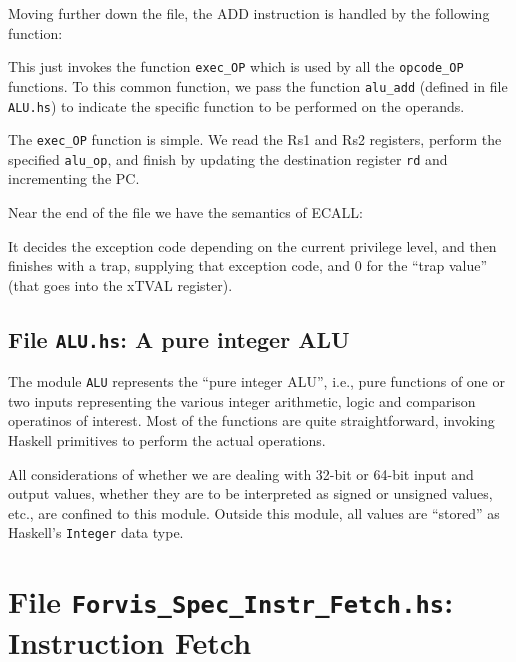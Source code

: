 \documentclass[11pt]{article}
\begin{document}
Moving further down the file, the ADD instruction is handled by the
following function:



This just invokes the function \verb|exec_OP| which is used by all the
\verb|opcode_OP| functions.  To this common function, we pass the
function \verb|alu_add| (defined in file \verb|ALU.hs|) to indicate
the specific function to be performed on the operands.

The \verb|exec_OP| function is simple.  We read the Rs1 and Rs2
registers, perform the specified \verb|alu_op|, and finish by updating
the destination register \verb|rd| and incrementing the PC.



Near the end of the file we have the semantics of ECALL:



It decides the exception code depending on the current privilege
level, and then finishes with a trap, supplying that exception code,
and 0 for the ``trap value'' (that goes into the xTVAL register).


\subsection{File {\tt ALU.hs}: A pure integer ALU}

The module \verb|ALU| represents the ``pure integer ALU'', i.e., pure
functions of one or two inputs representing the various integer
arithmetic, logic and comparison operatinos of interest.  Most of the
functions are quite straightforward, invoking Haskell primitives to
perform the actual operations.

All considerations of whether we are dealing with 32-bit or 64-bit
input and output values, whether they are to be interpreted as signed
or unsigned values, etc., are confined to this module.  Outside this
module, all values are ``stored'' as Haskell's \verb|Integer| data
type.


\section{File {\tt Forvis\_Spec\_Instr\_Fetch.hs}: Instruction Fetch}
\end{document}
